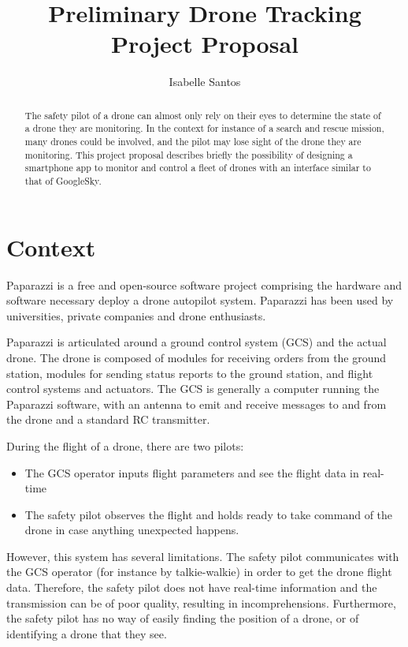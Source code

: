 \documentclass[10pt,letterpaper]{article}
\author{Isabelle Santos}
\title{Preliminary Drone Tracking Project Proposal}
\begin{document}
\maketitle
\begin{abstract}
The safety pilot of a drone can almost only rely on their eyes to determine the state of a drone they are monitoring. In the context for instance of a search and rescue mission, many drones could be involved, and the pilot may lose sight of the drone they are monitoring. This project proposal describes briefly the possibility of designing a smartphone app to monitor and control a fleet of drones with an interface similar to that of GoogleSky.
\end{abstract}

\section{Context}
Paparazzi is a free and open-source software project \cite{Paparazzi} comprising the hardware and software necessary deploy a drone autopilot system. Paparazzi has been used by universities, private companies and drone enthusiasts. 

Paparazzi is articulated around a ground control system (GCS) and the actual drone. The drone is composed of modules for receiving orders from the ground station, modules for sending status reports to the ground station, and flight control systems and actuators. The GCS is generally a computer running the Paparazzi software, with an antenna to emit and receive messages to and from the drone and a standard RC transmitter. 

During the flight of a drone, there are two pilots:
\begin{itemize}
\item The GCS operator inputs flight parameters and see the flight data in real-time
\item The safety pilot observes the flight and holds ready to take command of the drone in case anything unexpected happens. 
\end{itemize}

However, this system has several limitations. The safety pilot communicates with the GCS operator (for instance by talkie-walkie) in order to get the drone flight data. Therefore, the safety pilot does not have real-time information and the transmission can be of poor quality, resulting in incomprehensions. Furthermore, the safety pilot has no way of easily finding the position of a drone, or of identifying a drone that they see. 
\end{document}
